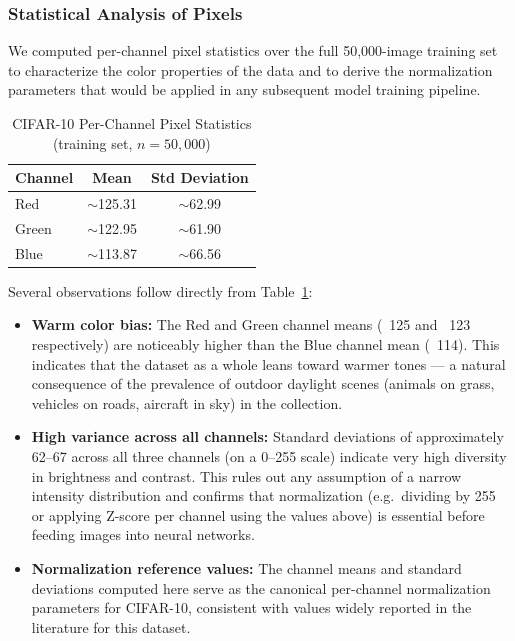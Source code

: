 \documentclass[twoside]{hcmut-report}
\begin{document}
\subsubsection{Statistical Analysis of Pixels}

We computed per-channel pixel statistics over the full 50,000-image training set
to characterize the color properties of the data and to derive the normalization
parameters that would be applied in any subsequent model training pipeline.

\begin{table}[H]
\centering
\caption{CIFAR-10 Per-Channel Pixel Statistics (training set, $n = 50{,}000$)}
\begin{tabular}{lcc}
\hline
\textbf{Channel} & \textbf{Mean} & \textbf{Std Deviation} \\
\hline
Red   & $\sim$125.31 & $\sim$62.99 \\
Green & $\sim$122.95 & $\sim$61.90 \\
Blue  & $\sim$113.87 & $\sim$66.56 \\
\hline
\end{tabular}
\label{tab:cifar_stats}
\end{table}

Several observations follow directly from Table~\ref{tab:cifar_stats}:

\begin{itemize}
    \item \textbf{Warm color bias:} The Red and Green channel means (~125 and ~123
    respectively) are noticeably higher than the Blue channel mean (~114). This
    indicates that the dataset as a whole leans toward warmer tones — a natural
    consequence of the prevalence of outdoor daylight scenes (animals on grass,
    vehicles on roads, aircraft in sky) in the collection.
    \item \textbf{High variance across all channels:} Standard deviations of
    approximately 62--67 across all three channels (on a 0--255 scale) indicate
    very high diversity in brightness and contrast. This rules out any assumption of
    a narrow intensity distribution and confirms that normalization
    (e.g.\ dividing by 255 or applying Z-score per channel using the values above)
    is essential before feeding images into neural networks.
    \item \textbf{Normalization reference values:} The channel means and standard
    deviations computed here serve as the canonical per-channel normalization
    parameters for CIFAR-10, consistent with values widely reported in the
    literature for this dataset.
\end{itemize}
\end{document}
